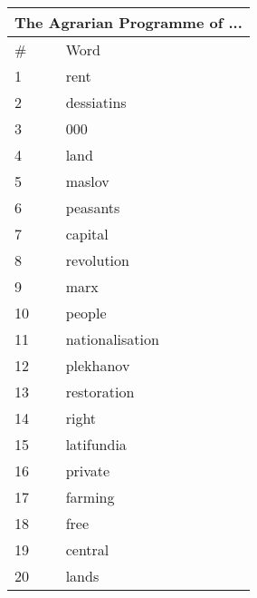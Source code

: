 \documentclass{pnastwo}
\begin{document}
\begin{article}
\begin{center}
  \begin{tabular}{ | l | l | }
    \hline
\multicolumn{2}{|c|}{The Agrarian Programme of ...} \\ \hline
\# & Word  \\ \hline
1 & rent \\ \hline
2 & dessiatins \\ \hline
3 & 000 \\ \hline
4 & land \\ \hline
5 & maslov \\ \hline
6 & peasants \\ \hline
7 & capital \\ \hline
8 & revolution \\ \hline
9 & marx \\ \hline
10 & people \\ \hline
11 & nationalisation \\ \hline
12 & plekhanov \\ \hline
13 & restoration \\ \hline
14 & right \\ \hline
15 & latifundia \\ \hline
16 & private \\ \hline
17 & farming \\ \hline
18 & free \\ \hline
19 & central \\ \hline
20 & lands \\ \hline
  \end{tabular}
\end{center}




\end{article}
\end{document}
